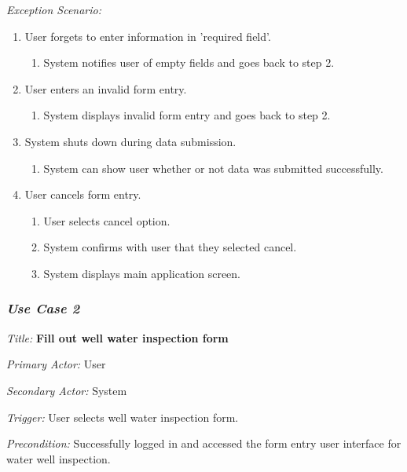 \documentclass[twoside,letterpaper]{article}
\begin{document}
{\color{black} \textit{Exception Scenario:}}
\begin{enumerate}
\item User forgets to enter information in 'required field'.
\begin{enumerate}
\item System notifies user of empty fields and goes back to step 2.
\end{enumerate}

\item User enters an invalid form entry.
\begin{enumerate}
\item System displays invalid form entry and goes back to step 2.
\end{enumerate}

\item System shuts down during data submission.
\begin{enumerate}
\item System can show user whether or not data was submitted successfully. 
\end{enumerate}

\item User cancels form entry.
\begin{enumerate}
\item User selects cancel option.
\item System confirms with user that they selected cancel.
\item System displays main application screen.

\end{enumerate}
\end{enumerate}


\subsubsection{\textit{Use Case 2}} 

\textit{Title: }{\bfseries\color{black} Fill out well water inspection form}

{\color{black} \textit{Primary Actor:} User}

{\color{black} \textit{Secondary Actor:} System}

{\color{black} \textit{Trigger:} User selects well water inspection form.}

{\color{black} \textit{Precondition:} Successfully logged in and accessed the form entry user interface for water well inspection.}
\end{document}

